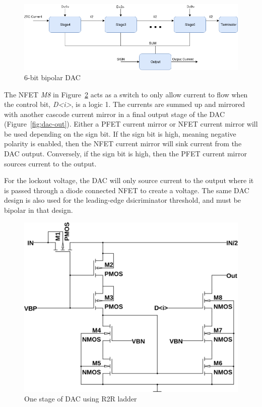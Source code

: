 \documentclass[12pt,oneside,final]{siuethesis}
\theoremstyle{definition}
\begin{document}
\begin{figure}[htbp!]
\centering
\includegraphics[scale=.55,keepaspectratio=true]{./ch3_figures/dac.png} 
\caption{6-bit bipolar DAC}
\label{fig:dac-block}
\end{figure}

\par The NFET \emph{M8} in Figure~\ref{fig:dac} acts as a switch to only allow current to flow when the control bit, \emph{D<i>}, is a logic 1. The currents are summed up and mirrored with another cascode current mirror in a final output stage of the DAC (Figure~\ref{fig:dac-out}). Either a PFET current mirror or NFET current mirror will be used depending on the sign bit. If the sign bit is high, meaning negative polarity is enabled, then the NFET current mirror will sink current from the DAC output. Conversely, if the sign bit is high, then the PFET current mirror sources current to the output.
\par For the lockout voltage, the DAC will only source current to the output where it is passed through a diode connected NFET to create a voltage. The same DAC design is also used for the leading-edge dsicriminator threshold, and must be bipolar in that design. 

\begin{figure}[htbp!]
\centering
\includegraphics[scale=.4,keepaspectratio=true]{../LTspice_Drawings/dac/dac_stage.png} 
\caption{One stage of DAC using R2R ladder}
\label{fig:dac}
\end{figure}
\end{document}
